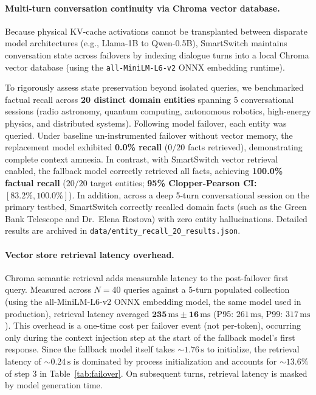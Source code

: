 \documentclass[11pt,a4paper]{article}
\newcommand{\su}{\,\mathrm{s}}
\newcommand{\code}[1]{\texttt{#1}}
\begin{document}
\paragraph{Multi-turn conversation continuity via Chroma vector database.}
Because physical KV-cache activations cannot be transplanted between disparate model architectures (e.g., Llama-1B to Qwen-0.5B), SmartSwitch maintains conversation state across failovers by indexing dialogue turns into a local Chroma vector database (using the \code{all-MiniLM-L6-v2} ONNX embedding runtime).

To rigorously assess state preservation beyond isolated queries, we benchmarked factual recall across \textbf{20 distinct domain entities} spanning 5 conversational sessions (radio astronomy, quantum computing, autonomous robotics, high-energy physics, and distributed systems). Following model failover, each entity was queried. Under baseline un-instrumented failover without vector memory, the replacement model exhibited \textbf{0.0\% recall} ($0/20$ facts retrieved), demonstrating complete context amnesia. In contrast, with SmartSwitch vector retrieval enabled, the fallback model correctly retrieved all facts, achieving \textbf{100.0\% factual recall} ($20/20$ target entities; \textbf{95\% Clopper-Pearson CI: $[83.2\%, 100.0\%]$}). In addition, across a deep 5-turn conversational session on the primary testbed, SmartSwitch correctly recalled domain facts (such as the Green Bank Telescope and Dr.~Elena Rostova) with zero entity hallucinations. Detailed results are archived in \code{data/entity\_recall\_20\_results.json}.

\paragraph{Vector store retrieval latency overhead.}
Chroma semantic retrieval adds measurable latency to the post-failover first query. Measured across $N=40$ queries against a 5-turn populated collection (using the all-MiniLM-L6-v2 ONNX embedding model, the same model used in production), retrieval latency averaged $\mathbf{235\,\mathrm{ms} \pm 16\,\mathrm{ms}}$ (P95: $261\,\mathrm{ms}$, P99: $317\,\mathrm{ms}$). This overhead is a one-time cost per failover event (not per-token), occurring only during the context injection step at the start of the fallback model's first response. Since the fallback model itself takes $\sim 1.76\su$ to initialize, the retrieval latency of $\sim 0.24\su$ is dominated by process initialization and accounts for $\sim 13.6\%$ of step 3 in Table~\ref{tab:failover}. On subsequent turns, retrieval latency is masked by model generation time.
\end{document}
